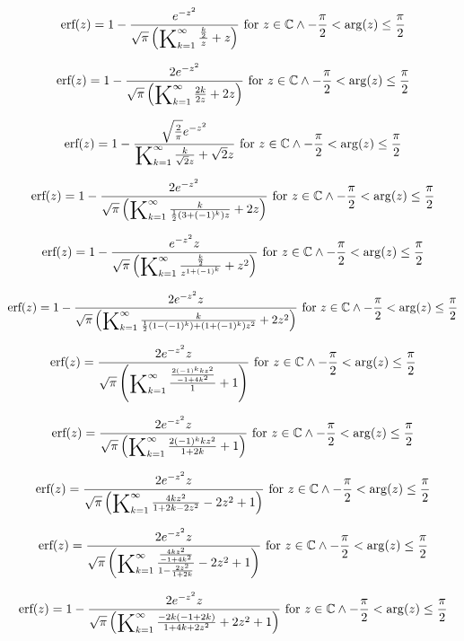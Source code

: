 \documentclass{article}
\newcommand{\bigK}{\mathop{\raisebox{-5pt}{\huge K}}}
\begin{document}
\[\text{erf}(z)=1-\frac{e^{-z^2}}{\sqrt{\pi } \left(\bigK_{k=1}^{\infty}\frac{\frac{k}{2}}{z}+z\right)}\text{ for }z\in \mathbb{C}\land -\frac{\pi }{2}<\arg (z)\leq \frac{\pi }{2}\] 

\[\text{erf}(z)=1-\frac{2 e^{-z^2}}{\sqrt{\pi } \left(\bigK_{k=1}^{\infty}\frac{2 k}{2 z}+2 z\right)}\text{ for }z\in \mathbb{C}\land -\frac{\pi }{2}<\arg (z)\leq \frac{\pi }{2}\] 

\[\text{erf}(z)=1-\frac{\sqrt{\frac{2}{\pi }} e^{-z^2}}{\bigK_{k=1}^{\infty}\frac{k}{\sqrt{2} z}+\sqrt{2} z}\text{ for }z\in \mathbb{C}\land -\frac{\pi }{2}<\arg (z)\leq \frac{\pi }{2}\] 

\[\text{erf}(z)=1-\frac{2 e^{-z^2}}{\sqrt{\pi } \left(\bigK_{k=1}^{\infty}\frac{k}{\frac{1}{2} \left(3+(-1)^k\right) z}+2 z\right)}\text{ for }z\in \mathbb{C}\land -\frac{\pi }{2}<\arg (z)\leq \frac{\pi }{2}\] 

\[\text{erf}(z)=1-\frac{e^{-z^2} z}{\sqrt{\pi } \left(\bigK_{k=1}^{\infty}\frac{\frac{k}{2}}{z^{1+(-1)^k}}+z^2\right)}\text{ for }z\in \mathbb{C}\land -\frac{\pi }{2}<\arg (z)\leq \frac{\pi }{2}\] 

\[\text{erf}(z)=1-\frac{2 e^{-z^2} z}{\sqrt{\pi } \left(\bigK_{k=1}^{\infty}\frac{k}{\frac{1}{2} \left(1-(-1)^k\right)+\left(1+(-1)^k\right) z^2}+2 z^2\right)}\text{ for }z\in \mathbb{C}\land -\frac{\pi }{2}<\arg (z)\leq \frac{\pi }{2}\] 

\[\text{erf}(z)=\frac{2 e^{-z^2} z}{\sqrt{\pi } \left(\bigK_{k=1}^{\infty}\frac{\frac{2 (-1)^k k z^2}{-1+4 k^2}}{1}+1\right)}\text{ for }z\in \mathbb{C}\land -\frac{\pi }{2}<\arg (z)\leq \frac{\pi }{2}\] 

\[\text{erf}(z)=\frac{2 e^{-z^2} z}{\sqrt{\pi } \left(\bigK_{k=1}^{\infty}\frac{2 (-1)^k k z^2}{1+2 k}+1\right)}\text{ for }z\in \mathbb{C}\land -\frac{\pi }{2}<\arg (z)\leq \frac{\pi }{2}\] 

\[\text{erf}(z)=\frac{2 e^{-z^2} z}{\sqrt{\pi } \left(\bigK_{k=1}^{\infty}\frac{4 k z^2}{1+2 k-2 z^2}-2 z^2+1\right)}\text{ for }z\in \mathbb{C}\land -\frac{\pi }{2}<\arg (z)\leq \frac{\pi }{2}\] 

\[\text{erf}(z)=\frac{2 e^{-z^2} z}{\sqrt{\pi } \left(\bigK_{k=1}^{\infty}\frac{\frac{4 k z^2}{-1+4 k^2}}{1-\frac{2 z^2}{1+2 k}}-2 z^2+1\right)}\text{ for }z\in \mathbb{C}\land -\frac{\pi }{2}<\arg (z)\leq \frac{\pi }{2}\] 

\[\text{erf}(z)=1-\frac{2 e^{-z^2} z}{\sqrt{\pi } \left(\bigK_{k=1}^{\infty}\frac{-2 k (-1+2 k)}{1+4 k+2 z^2}+2 z^2+1\right)}\text{ for }z\in \mathbb{C}\land -\frac{\pi }{2}<\arg (z)\leq \frac{\pi }{2}\] 
\end{document}
